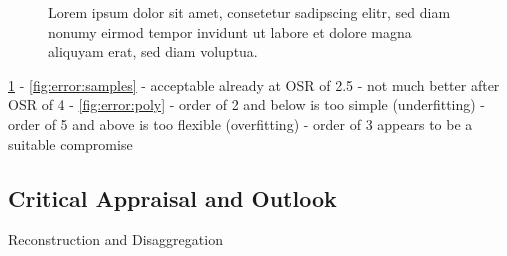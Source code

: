 \begin{figure}
    \noindent{}
    \noindent{}
    \caption{Lorem ipsum dolor sit amet, consetetur sadipscing elitr, sed diam nonumy eirmod tempor invidunt ut labore et dolore magna aliquyam erat, sed diam voluptua.}
    \label{fig:error}
\end{figure}

\cref{fig:error}
- \cref{fig:error:samples}
  - acceptable already at OSR of 2.5
  - not much better after OSR of 4
- \cref{fig:error:poly}
  - order of 2 and below is too simple (underfitting)
  - order of 5 and above is too flexible (overfitting)
  - order of 3 appears to be a suitable compromise


\subsection{Critical Appraisal and Outlook}

Reconstruction and Disaggregation

